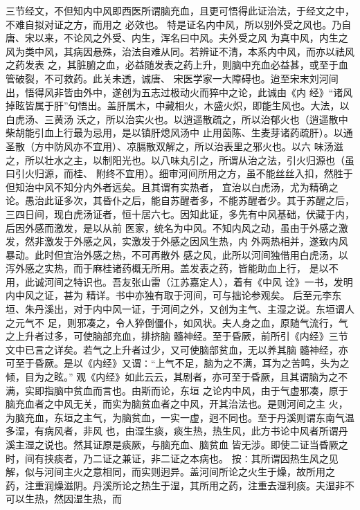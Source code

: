 \documentclass[a4paper,12pt,UTF8,twoside]{ctexbook}
\begin{document}
三节经文，不但知内中风即西医所谓脑充血，且更可悟得此证治法，于经文之中，不难自拟对证之方，而用之 
必效也。 
特是证名内中风，所以别外受之风也。乃自唐、宋以来，不论风之外受、内生，浑名曰中风。夫外受之风 
为真中风，内生之风为类中风，其病因悬殊，治法自难从同。若辨证不清，本系内中风，而亦以祛风之药发表 
之，其脏腑之血，必益随发表之药上升，则脑中充血必益甚，或至于血管破裂，不可救药。此关未透，诚唐、 
宋医学家一大障碍也。迨至宋末刘河间出，悟得风非皆由外中，遂创为五志过极动火而猝中之论，此诚由《内 
经》“诸风掉眩皆属于肝”句悟出。盖肝属木，中藏相火，木盛火炽，即能生风也。大法，以白虎汤、三黄汤 
沃之，所以治实火也。以逍遥散疏之，所以治郁火也（逍遥散中柴胡能引血上行最为忌用，是以镇肝熄风汤中 
止用茵陈、生麦芽诸药疏肝）。以通圣散（方中防风亦不宜用）、凉膈散双解之，所以治表里之邪火也。以六 
味汤滋之，所以壮水之主，以制阳光也。以八味丸引之，所谓从治之法，引火归源也（虽曰引火归源，而桂、 
附终不宜用）。细审河间所用之方，虽不能丝丝入扣，然胜于但知治中风不知分内外者远矣。且其谓有实热者， 
宜治以白虎汤，尤为精确之论。愚治此证多次，其昏仆之后，能自苏醒者多，不能苏醒者少。其于苏醒之后， 
三四日间，现白虎汤证者，恒十居六七。因知此证，多先有中风基础，伏藏于内，后因外感而激发，是以从前 
医家，统名为中风。不知内风之动，虽由于外感之激发，然非激发于外感之风，实激发于外感之因风生热，内 
外两热相并，遂致内风暴动。此时但宜治外感之热，不可再散外 
感之风，此所以河间独借用白虎汤，以泻外感之实热，而于麻桂诸药概无所用。盖发表之药，皆能助血上行， 
是以不用，此诚河间之特识也。吾友张山雷（江苏嘉定人），着有《中风 诠》一书，发明内中风之证，甚为 
精详。书中亦独有取于河间，可与拙论参观矣。 
后至元李东垣、朱丹溪出，对于内中风一证，于河间之外，又创为主气、主湿之说。东垣谓人之元气不 
足，则邪凑之，令人猝倒僵仆，如风状。夫人身之血，原随气流行，气之上升者过多，可使脑部充血，排挤脑 
髓神经。至于昏厥，前所引《内经》三节文中已言之详矣。若气之上升者过少，又可使脑部贫血，无以养其脑 
髓神经，亦可至于昏厥。是以《内经》又谓∶“上气不足，脑为之不满，耳为之苦鸣，头为之倾，目为之眩。” 
观《内经》如此云云，其剧者，亦可至于昏厥，且其谓脑为之不满，实即指脑中贫血而言也。由斯而论，东垣 
之论内中风，由于气虚邪凑，原于脑充血者之中风无关，而实为脑贫血者之中风，开其治法也。是则河间之主 
火，为脑充血，东垣之主气，为脑贫血，一实一虚，迥不同也。至于丹溪则谓东南气温多湿，有病风者，非风 
也，由湿生痰，痰生热，热生风，此方书论中风者所谓丹溪主湿之说也。然其证原是痰厥，与脑充血、脑贫血 
皆无涉。即使二证当昏厥之时，间有挟痰者，乃二证之兼证，非二证之本病也。 
按∶其所谓因热生风之见解，似与河间主火之意相同，而实则迥异。盖河间所论之火生于燥，故所用之 
药，注重润燥滋阴。丹溪所论之热生于湿，其所用之药，注重去湿利痰。夫湿非不可以生热，然因湿生热，而 
\end{document}
